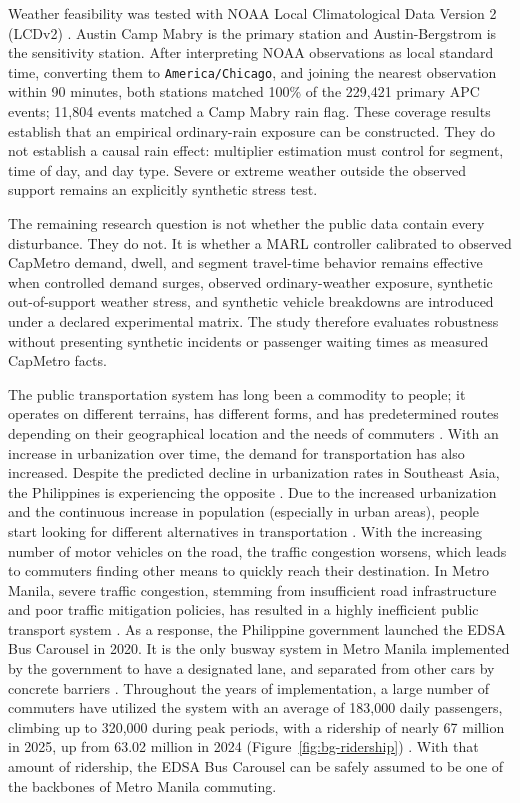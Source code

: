 Weather feasibility was tested with NOAA Local Climatological Data Version 2 (LCDv2) \cite{NOAALCDv2}. Austin Camp Mabry is the primary station and Austin-Bergstrom is the sensitivity station. After interpreting NOAA observations as local standard time, converting them to \texttt{America/Chicago}, and joining the nearest observation within 90 minutes, both stations matched 100\% of the 229{,}421 primary APC events; 11{,}804 events matched a Camp Mabry rain flag. These coverage results establish that an empirical ordinary-rain exposure can be constructed. They do not establish a causal rain effect: multiplier estimation must control for segment, time of day, and day type. Severe or extreme weather outside the observed support remains an explicitly synthetic stress test.

The remaining research question is not whether the public data contain every disturbance. They do not. It is whether a MARL controller calibrated to observed CapMetro demand, dwell, and segment travel-time behavior remains effective when controlled demand surges, observed ordinary-weather exposure, synthetic out-of-support weather stress, and synthetic vehicle breakdowns are introduced under a declared experimental matrix. The study therefore evaluates robustness without presenting synthetic incidents or passenger waiting times as measured CapMetro facts.

\iffalse
The public transportation system has long been a commodity to people; it operates on different terrains, has different forms, and has predetermined routes depending on their geographical location and the needs of commuters \cite{Tironi2018}. With an increase in urbanization over time, the demand for transportation has also increased. Despite the predicted decline in urbanization rates in Southeast Asia, the Philippines is experiencing the opposite \cite{UN_WUP2018}. Due to the increased urbanization and the continuous increase in population (especially in urban areas), people start looking for different alternatives in transportation \cite{Cervero2000}. With the increasing number of motor vehicles on the road, the traffic congestion worsens, which leads to commuters finding other means to quickly reach their destination. In Metro Manila, severe traffic congestion, stemming from insufficient road infrastructure and poor traffic mitigation policies, has resulted in a highly inefficient public transport system \cite{Spatio2026}. As a response, the Philippine government launched the EDSA Bus Carousel in 2020. It is the only busway system in Metro Manila implemented by the government to have a designated lane, and separated from other cars by concrete barriers \cite{Chua2026}. Throughout the years of implementation, a large number of commuters have utilized the system with an average of 183,000 daily passengers, climbing up to 320,000 during peak periods, with a ridership of nearly 67 million in 2025, up from 63.02 million in 2024 (Figure~\ref{fig:bg-ridership}) \cite{DOTr2025Ridership}. With that amount of ridership, the EDSA Bus Carousel can be safely assumed to be one of the backbones of Metro Manila commuting.

